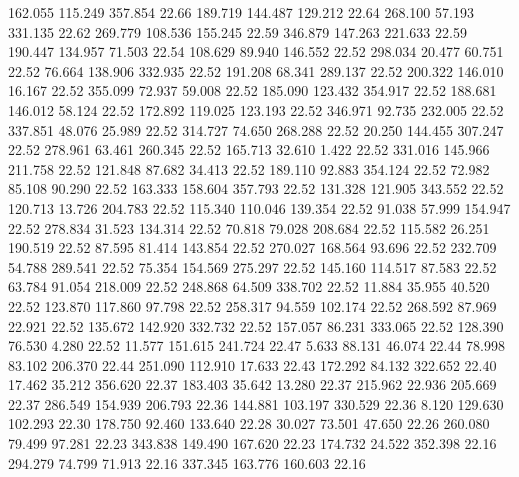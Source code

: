  162.055  115.249  357.854        22.66
 189.719  144.487  129.212        22.64
 268.100   57.193  331.135        22.62
 269.779  108.536  155.245        22.59
 346.879  147.263  221.633        22.59
 190.447  134.957   71.503        22.54
 108.629   89.940  146.552        22.52
 298.034   20.477   60.751        22.52
  76.664  138.906  332.935        22.52
 191.208   68.341  289.137        22.52
 200.322  146.010   16.167        22.52
 355.099   72.937   59.008        22.52
 185.090  123.432  354.917        22.52
 188.681  146.012   58.124        22.52
 172.892  119.025  123.193        22.52
 346.971   92.735  232.005        22.52
 337.851   48.076   25.989        22.52
 314.727   74.650  268.288        22.52
  20.250  144.455  307.247        22.52
 278.961   63.461  260.345        22.52
 165.713   32.610    1.422        22.52
 331.016  145.966  211.758        22.52
 121.848   87.682   34.413        22.52
 189.110   92.883  354.124        22.52
  72.982   85.108   90.290        22.52
 163.333  158.604  357.793        22.52
 131.328  121.905  343.552        22.52
 120.713   13.726  204.783        22.52
 115.340  110.046  139.354        22.52
  91.038   57.999  154.947        22.52
 278.834   31.523  134.314        22.52
  70.818   79.028  208.684        22.52
 115.582   26.251  190.519        22.52
  87.595   81.414  143.854        22.52
 270.027  168.564   93.696        22.52
 232.709   54.788  289.541        22.52
  75.354  154.569  275.297        22.52
 145.160  114.517   87.583        22.52
  63.784   91.054  218.009        22.52
 248.868   64.509  338.702        22.52
  11.884   35.955   40.520        22.52
 123.870  117.860   97.798        22.52
 258.317   94.559  102.174        22.52
 268.592   87.969   22.921        22.52
 135.672  142.920  332.732        22.52
 157.057   86.231  333.065        22.52
 128.390   76.530    4.280        22.52
  11.577  151.615  241.724        22.47
   5.633   88.131   46.074        22.44
  78.998   83.102  206.370        22.44
 251.090  112.910   17.633        22.43
 172.292   84.132  322.652        22.40
  17.462   35.212  356.620        22.37
 183.403   35.642   13.280        22.37
 215.962   22.936  205.669        22.37
 286.549  154.939  206.793        22.36
 144.881  103.197  330.529        22.36
   8.120  129.630  102.293        22.30
 178.750   92.460  133.640        22.28
  30.027   73.501   47.650        22.26
 260.080   79.499   97.281        22.23
 343.838  149.490  167.620        22.23
 174.732   24.522  352.398        22.16
 294.279   74.799   71.913        22.16
 337.345  163.776  160.603        22.16
